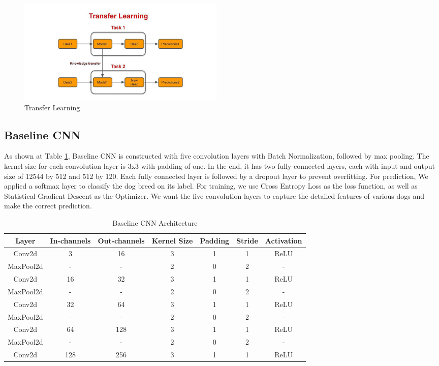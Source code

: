 \documentclass{article}
\begin{document}
 \begin{figure}[h!]
    \centering
    \includegraphics[width=10cm]{transferLearning.jpg}
    \caption{Transfer Learning}
    \label{fig:aug}
\end{figure}


\subsection{Baseline CNN}
As shown at Table \ref{tab:baseline_cnn}, Baseline CNN is constructed with five convolution layers with Batch Normalization, followed by max pooling. The kernel size for each convolution layer is 3x3 with padding of one. In the end, it has two fully connected layers, each with input and output size of 12544 by 512 and 512 by 120. Each fully connected layer is followed by a dropout layer to prevent overfitting. For prediction, We applied a softmax layer to classify the dog breed on its label. For training, we use Cross Entropy Loss as the loss function, as well as Statistical Gradient Descent as the Optimizer. We want the five convolution layers to capture the detailed features of various dogs and make the correct prediction.

\begin{table}[h!]
\centering
\begin{tabular}{ |c||c|c|c|c|c|c| } 
 \hline
 Layer & In-channels & Out-channels & Kernel Size & Padding & Stride & Activation \\ 
 \hline\hline
 Conv2d & 3 & 16 & 3 & 1 & 1 & ReLU\\ 
 \hline
 MaxPool2d & - & - & 2 & 0 & 2  & -\\
 \hline 
 Conv2d & 16 & 32 & 3 & 1 & 1 & ReLU\\ 
  \hline
 MaxPool2d & - & - & 2 & 0 & 2  & -\\
 \hline
  Conv2d & 32 & 64 & 3 & 1 & 1  & ReLU\\ 
   \hline
 MaxPool2d & - & - & 2 & 0 & 2  & -\\
 \hline
 Conv2d & 64 & 128 & 3 & 1 & 1  & ReLU\\ 
  \hline
 MaxPool2d & - & - & 2 & 0 & 2  & -\\
 \hline
  Conv2d & 128 & 256 & 3 & 1 & 1  & ReLU\\ 
 \hline
\end{tabular}
\caption{Baseline CNN Architecture}
\label{tab:baseline_cnn}
\end{table}
\end{document}
